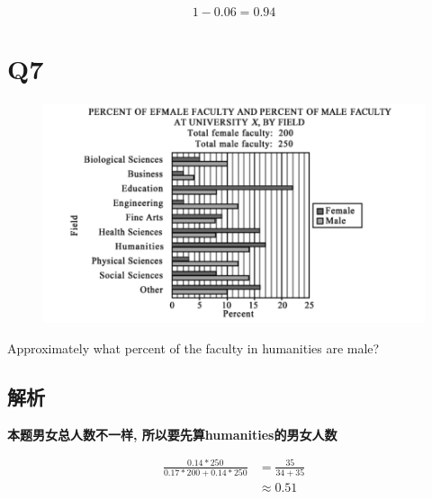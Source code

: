     \begin{equation*}
      1 - 0.06 = 0.94
    \end{equation*}

\section{Q7}

  \begin{figure}[H]
    \centering
    \includegraphics[width=0.7\columnwidth]{images/areas/stats/q7.png}
  \end{figure}

  Approximately what percent of the faculty in humanities are male?

  \subsection{解析}

    \textbf{本题男女总人数不一样, 所以要先算humanities的男女人数}

    \begin{align*}
      \frac{0.14 * 250}{0.17 * 200 + 0.14 * 250}
      &= \frac{35}{34 + 35} \\
      &\approx 0.51
    \end{align*}
